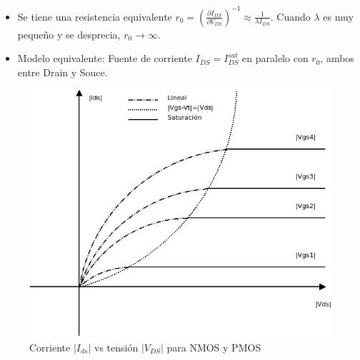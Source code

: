 \documentclass[oneside]{book}
\numberwithin{equation}{section}
\numberwithin{figure}{section}
\numberwithin{table}{section}
\begin{document}
\begin{enumerate}
\begin{itemize}
							\item Se tiene una resistencia equivalente $\displaystyle r_0=\left(\frac{\partial I_{DS}}{\partial V_{DS}}\right)^{-1} \approx \frac{1}{\lambda I_{DS}}$. Cuando $\lambda$ es muy pequeño y se desprecia, $r_0 \to \infty$.
							\item Modelo equivalente: Fuente de corriente $I_{DS}=I_{DS}^{sat}$ en paralelo con $r_0$, ambos entre Drain y Souce.
						\end{itemize}
				\end{enumerate}
						
				\begin{figure}[H]
					\begin{center}
						\includegraphics[scale=0.5]{Curvas-MOS.jpeg}
						\caption{Corriente $|I_{ds}|$ vs tensión $|V_{DS}|$ para NMOS y PMOS}
					\end{center}
				\end{figure}					
				
\end{document}
